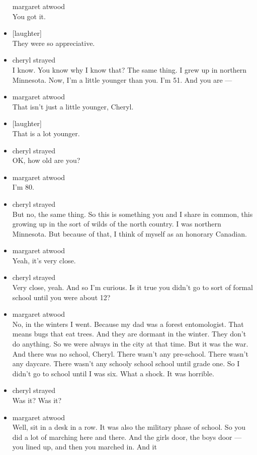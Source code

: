 \begin{itemize}
  margaret atwood\\
  You got it.
\item
  {[}laughter{]}\\
  They were so appreciative.
\item
  cheryl strayed\\
  I know. You know why I know that? The same thing. I grew up in
  northern Minnesota. Now, I'm a little younger than you. I'm 51. And
  you are ---
\item
  margaret atwood\\
  That isn't just a little younger, Cheryl.
\item
  {[}laughter{]}\\
  That is a lot younger.
\item
  cheryl strayed\\
  OK, how old are you?
\item
  margaret atwood\\
  I'm 80.
\item
  cheryl strayed\\
  But no, the same thing. So this is something you and I share in
  common, this growing up in the sort of wilds of the north country. I
  was northern Minnesota. But because of that, I think of myself as an
  honorary Canadian.
\item
  margaret atwood\\
  Yeah, it's very close.
\item
  cheryl strayed\\
  Very close, yeah. And so I'm curious. Is it true you didn't go to sort
  of formal school until you were about 12?
\item
  margaret atwood\\
  No, in the winters I went. Because my dad was a forest entomologist.
  That means bugs that eat trees. And they are dormant in the winter.
  They don't do anything. So we were always in the city at that time.
  But it was the war. And there was no school, Cheryl. There wasn't any
  pre-school. There wasn't any daycare. There wasn't any schooly school
  school until grade one. So I didn't go to school until I was six. What
  a shock. It was horrible.
\item
  cheryl strayed\\
  Was it? Was it?
\item
  margaret atwood\\
  Well, sit in a desk in a row. It was also the military phase of
  school. So you did a lot of marching here and there. And the girls
  door, the boys door --- you lined up, and then you marched in. And it

\end{itemize}
